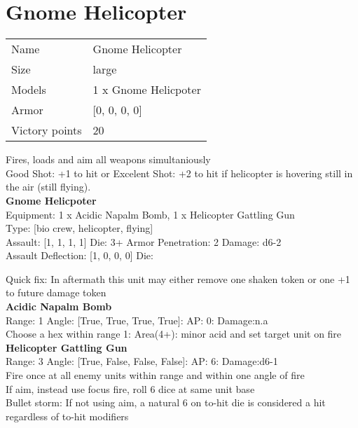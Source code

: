 \pagebreak

\section{ Gnome Helicopter }

\begin{tabular}{ll}
  Name & Gnome Helicopter \\
  Size & large\\
  Models & 1 x Gnome Helicpoter\\
  Armor & [0, 0, 0, 0]\\
  Victory points & 20\\
\end{tabular}

Fires, loads and aim all weapons simultaniously\\ 
Good Shot: +1 to hit or Excelent Shot: +2 to hit if helicopter is hovering still in the air (still flying).\\ 


{\bf Gnome Helicpoter } \\
Equipment: 1 x Acidic Napalm Bomb, 1 x Helicopter Gattling Gun \\
Type: [bio crew, helicopter, flying] \\

Assault: [1, 1, 1, 1] Die: 3+ Armor Penetration: 2 Damage: d6-2 \\
Assault Deflection: [1, 0, 0, 0] Die: \\
\indent  

Quick fix: In aftermath this unit may either remove one shaken token or one +1 to future damage token\\ 


{\bf Acidic Napalm Bomb } \\



Range: 1  Angle: [True, True, True, True]: AP: 0: Damage:n.a \\
Choose a hex within range 1: Area(4+): minor acid and set target unit on fire\\ 




{\bf Helicopter Gattling Gun } \\



Range: 3  Angle: [True, False, False, False]: AP: 6: Damage:d6-1 \\
Fire once at all enemy units within range and within one angle of fire\\ 
If aim, instead use focus fire, roll 6 dice at same unit base\\ 
Bullet storm: If not using aim, a natural 6 on to-hit die is considered a hit regardless of to-hit modifiers\\ 




